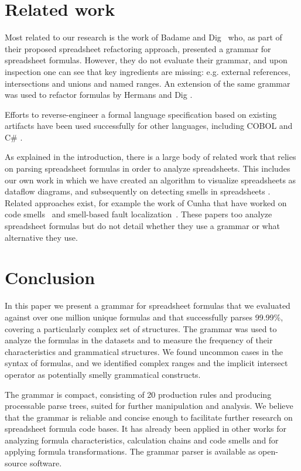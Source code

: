 \documentclass[conference]{IEEEtran}
\begin{document}
\section{Related work}
\label{section:relatedWork}
Most related to our research is the work of Badame and Dig~\cite{badame2012refactoring} who, as part of their proposed spreadsheet refactoring approach, presented a grammar for spreadsheet formulas. However, they do not evaluate their grammar, and upon inspection one can see that key ingredients are missing: e.g. external references, intersections and unions and named ranges. An extension of the same grammar was used to refactor formulas by Hermans and Dig \cite{hermans2014bumblebee}.

Efforts to reverse-engineer a formal language specification based on existing artifacts have been used successfully for other languages, including COBOL \cite{van1997obtaining} and C\# \cite{zaytsev2010recovery}.

As explained in the introduction, there is a large body of related work that relies on parsing spreadsheet formulas in order to analyze spreadsheets. This includes our own work in which we have created an algorithm to visualize spreadsheets as dataflow diagrams\cite{DBLP:conf/icse/HermansPD11}, and subsequently on detecting smells in spreadsheets \cite{DBLP:conf/icse/HermansPD12,DBLP:conf/icsm/Hermans212}. Related approaches exist, for example the work of Cunha that have worked on code smells~\cite{iccsa12} and smell-based fault localization~\cite{conf/icsme/CunhaFMPS14}. These papers too analyze spreadsheet formulas but do not detail whether they use a grammar or what alternative they use.

\section{Conclusion}
\label{section:conclusion}
In this paper we present a grammar for spreadsheet formulas that we evaluated against over one million unique formulas and that successfully parses 99.99\%, covering a particularly complex set of structures. The grammar was used to analyze the formulas in the datasets and to measure the frequency of their characteristics and grammatical structures. We found uncommon cases in the syntax of formulas, and we identified complex ranges and the implicit intersect operator as potentially smelly grammatical constructs.

The grammar is compact, consisting of 20 production rules and producing processable parse trees, suited for further manipulation and analysis. We believe that the grammar is reliable and concise enough to facilitate further research on spreadsheet formula code bases. It has already been applied in other works for analyzing formula characteristics, calculation chains and code smells and for applying formula transformations. The grammar parser is available as open-source software.
\end{document}
